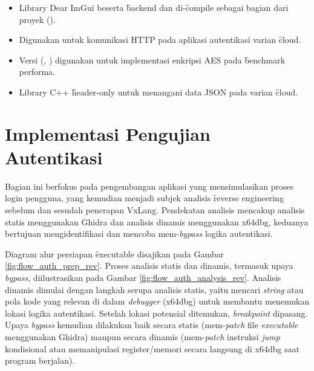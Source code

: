\begin{itemize}
\begin{itemize}
		      \item {} Library Dear ImGui beserta \f{backend}  dan  di-\f{compile} sebagai bagian dari proyek ().
		      \item {} Digunakan untuk komunikasi HTTP pada aplikasi autentikasi varian \f{cloud}.
		      \item {} Versi  (, ) digunakan untuk implementasi enkripsi AES pada \f{benchmark} performa.
		      \item {} Library C++ \f{header-only} untuk menangani data JSON pada varian \f{cloud}.
	      \end{itemize}
\end{itemize}

\section{Implementasi Pengujian Autentikasi}
Bagian ini berfokus pada pengembangan aplikasi yang mensimulasikan proses login pengguna, yang kemudian menjadi subjek analisis \f{reverse engineering} sebelum dan sesudah penerapan VxLang. Pendekatan analisis mencakup analisis statis menggunakan Ghidra dan analisis dinamis menggunakan x64dbg, keduanya bertujuan mengidentifikasi dan mencoba mem-\textit{bypass} logika autentikasi.

Diagram alur persiapan \f{executable} disajikan pada Gambar \ref{fig:flow_auth_prep_rev}. Proses analisis statis dan dinamis, termasuk upaya \textit{bypass}, diilustrasikan pada Gambar \ref{fig:flow_auth_analysis_rev}. Analisis dinamis dimulai dengan langkah serupa analisis statis, yaitu mencari \textit{string} atau pola kode yang relevan di dalam \textit{debugger} (x64dbg) untuk membantu menemukan lokasi logika autentikasi. Setelah lokasi potensial ditemukan, \textit{breakpoint} dipasang. Upaya \textit{bypass} kemudian dilakukan baik secara statis (mem-\textit{patch} file \textit{executable} menggunakan Ghidra) maupun secara dinamis (mem-\textit{patch} instruksi \textit{jump} kondisional atau memanipulasi register/memori secara langsung di x64dbg saat program berjalan).

